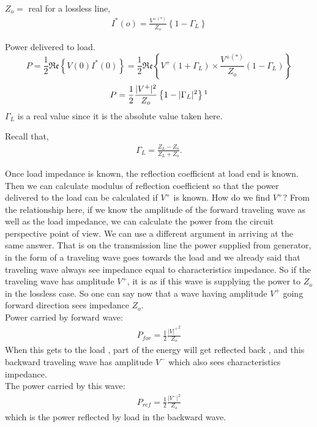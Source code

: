 $Z_o= $ real for a lossless line,
\begin{align*}
I^\ast (o) =\frac{V^{+ (\ast )}}{Z_o}\left\lbrace 1 -\Gamma_L \right\rbrace
\end{align*}

Power delivered to load.
\begin{dmath*}
P = \frac{1}{2}\mathfrak{Re}\left\lbrace V(0) I^\ast(0) \right\rbrace= \frac{1}{2}\mathfrak{Re}\left\lbrace V^+(1+\Gamma_L) \times\frac{V^{+(\ast)}}{Z_o} (1-\Gamma_L)\right\rbrace
\end{dmath*}
\begin{equation}
P = \frac{1}{2} \frac{|V^+|^2}{Z_o} \left\lbrace 1 -|\Gamma_L|^2 \right\rbrace\footnotemark
\end{equation}
$\Gamma_L$ is a real value since it is the absolute value taken here.

Recall that,
\begin{align*}\Gamma_L = \frac{ Z_L -Z_o }{ Z_L + Z_o }.
\end{align*}

Once load impedance is known, the reflection coefficient at load end is known. Then we can calculate modulus of reflection coefficient so that the power delivered to the load can be calculated if $V^+$ is known. How do we find $V^+ ? $ From the relationship here, if we know the amplitude of the forward traveling wave as well as the load impedance, we can calculate the power from the circuit perspective point of view. We can use a different argument in arriving at the same answer. That is on the transmission line the power supplied from generator, in the form of a traveling wave goes towards the load and we already said that traveling wave always see impedance equal to characteristics impedance. So if the traveling wave has amplitude $V^+$, it is as if this wave is supplying the power to $Z_o$ in the lossless case. So one can say now that  a wave having amplitude $V^+$ going forward direction sees impedance $Z_o$.\\
Power carried by forward wave:  
\begin{align*}
P_{for}= \frac{1}{2} \frac{{| V |^+}^2}{Z_o}
\end{align*}
When this gets to the load , part of the energy will get reflected back , and this backward traveling wave has amplitude $V^-$ which also sees characteristics impedance.\\
The power carried by this wave:
\begin{align*}
P_{ref}= \frac{1}{2}\frac{{|V^-|}^2}{Z_o}
\end{align*}
which is the power reflected by load in the backward wave.

